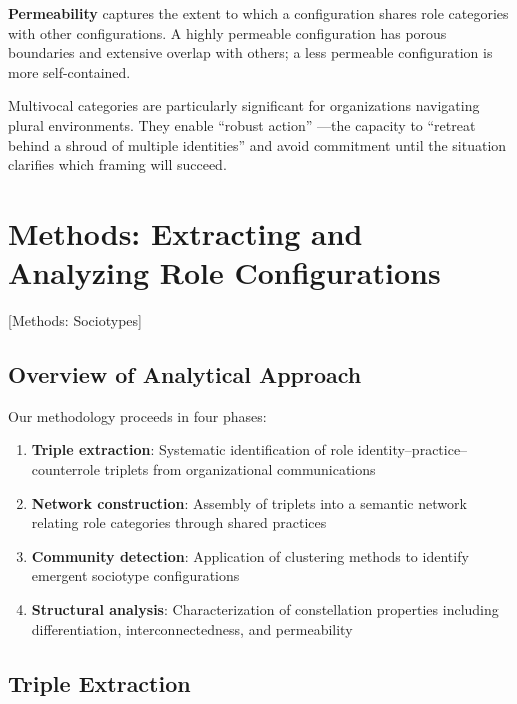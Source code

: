 \documentclass[../main.tex]{subfiles}
\begin{document}
\textbf{Permeability} captures the extent to which a configuration shares role categories with other configurations. A highly permeable configuration has porous boundaries and extensive overlap with others; a less permeable configuration is more self-contained.

Multivocal categories are particularly significant for organizations navigating plural environments. They enable ``robust action'' \cite{padgett1993robust,gehman2022robust}---the capacity to ``retreat behind a shroud of multiple identities'' and avoid commitment until the situation clarifies which framing will succeed.


\section{Methods: Extracting and Analyzing Role Configurations}[Methods: Sociotypes]

\subsection{Overview of Analytical Approach}

Our methodology proceeds in four phases:

\begin{enumerate}
    \item \textbf{Triple extraction}: Systematic identification of role identity--practice--counterrole triplets from organizational communications
    \item \textbf{Network construction}: Assembly of triplets into a semantic network relating role categories through shared practices
    \item \textbf{Community detection}: Application of clustering methods to identify emergent sociotype configurations
    \item \textbf{Structural analysis}: Characterization of constellation properties including differentiation, interconnectedness, and permeability
\end{enumerate}

\subsection{Triple Extraction}
\end{document}
